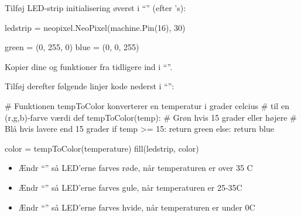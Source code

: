 \documentclass{ucph-handout}
\begin{document}
\begin{exercisebox}[adjusted title=Vælg mellem farver]

Tilføj LED-strip initialisering øverst i ``'' (efter 's):
\begin{python}
ledstrip = neopixel.NeoPixel(machine.Pin(16), 30)

green = (0, 255, 0)
blue = (0, 0, 255)
\end{python}

\noindent
Kopier dine  og  funktioner fra tidligere
ind i ``''.

\vspace{2mm}
\noindent
Tilføj derefter følgende linjer kode nederst i ``'':
\begin{python}
# Funktionen tempToColor konverterer en temperatur i grader celcius
# til en (r,g,b)-farve værdi
def tempToColor(temp):
    # Grøn hvis 15 grader eller højere
    # Blå hvis lavere end 15 grader
    if temp >= 15:
        return green
    else:
        return blue 

color = tempToColor(temperature)
fill(ledstrip, color)
\end{python}
\vspace{-2mm}

\begin{itemize}
\item Ændr ``'' så LED'erne farves røde, når
  temperaturen er over 35 \textdegree C
\item Ændr ``'' så LED'erne farves gule, når temperaturen er 25-35\textdegree C
\item Ændr ``'' så LED'erne farves hvide, når temperaturen er under 0\textdegree C
\end{itemize}
\end{exercisebox}
\end{document}

